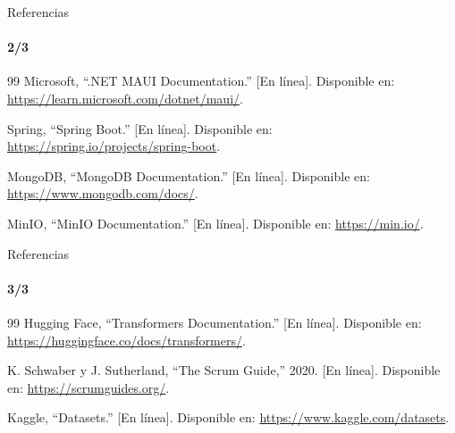\documentclass[aspectratio=169,10pt]{beamer}
\newcounter{bibliographycontinuation}
\begin{document}
\begin{frame}[t]{Referencias}
\framesubtitle{2/3}
\fontsize{9}{10.5}\selectfont
\begin{thebibliography}{99}
\setlength{\itemsep}{0.25cm}
\setcounter{enumiv}{\value{bibliographycontinuation}}
Microsoft, ``.NET MAUI Documentation.'' [En línea]. Disponible en: \url{https://learn.microsoft.com/dotnet/maui/}.

Spring, ``Spring Boot.'' [En línea]. Disponible en: \url{https://spring.io/projects/spring-boot}.

MongoDB, ``MongoDB Documentation.'' [En línea]. Disponible en: \url{https://www.mongodb.com/docs/}.

MinIO, ``MinIO Documentation.'' [En línea]. Disponible en: \url{https://min.io/}.

\setcounter{bibliographycontinuation}{\value{enumiv}}
\end{thebibliography}
\end{frame}
\begin{frame}[t]{Referencias}
\framesubtitle{3/3}
\fontsize{9}{10.5}\selectfont
\begin{thebibliography}{99}
\setlength{\itemsep}{0.25cm}
\setcounter{enumiv}{\value{bibliographycontinuation}}
Hugging Face, ``Transformers Documentation.'' [En línea]. Disponible en: \url{https://huggingface.co/docs/transformers/}.

K. Schwaber y J. Sutherland, ``The Scrum Guide,'' 2020. [En línea]. Disponible en: \url{https://scrumguides.org/}.

Kaggle, ``Datasets.'' [En línea]. Disponible en: \url{https://www.kaggle.com/datasets}.

\setcounter{bibliographycontinuation}{\value{enumiv}}
\end{thebibliography}
\end{frame}
\begin{frame}[plain]\begin{center}\par\vspace{.25cm}{\color{Terracotta}\rule{1.4cm}{1.2pt}}\par{}\end{center}\end{frame}
\end{document}
